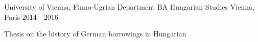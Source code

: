 \begin{cventries}
  \cventry
    {University of Vienna, Finno-Ugrian Department} %
    {BA Hungarian Studies} %
    {Vienna, Paris} %
    {2014 - 2016} %
    {
      \begin{cvitems} %
        \item {Thesis on the history of German borrowings in Hungarian}
      \end{cvitems}
    }

\end{cventries}
